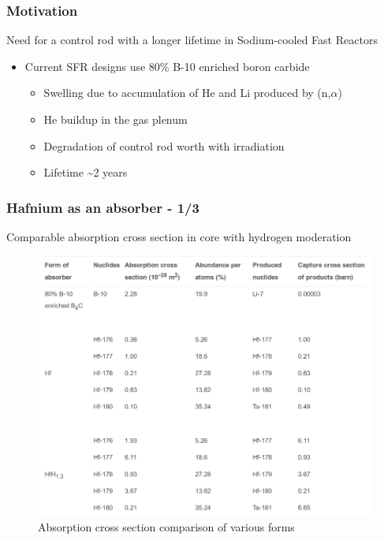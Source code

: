 \documentclass[9pt]{beamer}
\begin{document}
\begin{frame}
\frametitle{Motivation}
Need for a control rod with a longer lifetime in Sodium-cooled Fast Reactors
\begin{itemize}
  \item Current \gls{SFR} designs use 80\% B-10 enriched  boron carbide
  \begin{itemize}
    \item Swelling due to accumulation of He and Li produced by (n,$\alpha$)
    \item He buildup in the gas plenum
    \item Degradation of control rod worth with irradiation
    \item Lifetime \textasciitilde 2 years
  \end{itemize}
\end{itemize}
\end{frame}


\begin{frame}
\frametitle{Hafnium as an absorber - 1/3}
Comparable absorption cross section in core with hydrogen moderation 
\begin{figure}[htbp!]
  \begin{center}
      \includegraphics[scale=0.23]{./images/axs.png}
  \end{center}
  \caption{Absorption cross section comparison of various forms}
  \label{fig:axs}
\end{figure}

\end{frame}
\end{document}
